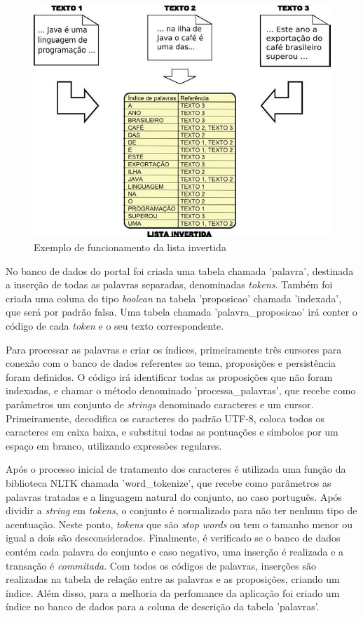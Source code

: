 \documentclass[
	12pt,				%
	openright,			%
	twoside,			%
	a4paper,			%
	english,			%
	french,				%
	spanish,			%
	brazil				%
	]{abntex2}
\begin{document}
{\begin{figure}[htb]
	\caption{\label{listainvertida}Exemplo de funcionamento da lista invertida}
	\begin{center}
	    \includegraphics[scale=0.65]{listainv.jpg}
	\end{center}
\end{figure}

No banco de dados do portal foi criada uma tabela chamada 'palavra', destinada a inserção de todas as palavras separadas, 
denominadas \emph{tokens}. Também foi criada uma coluna do tipo \emph{boolean} na tabela 'proposicao' chamada 'indexada', 
que será por padrão falsa. Uma tabela chamada 'palavra\_proposicao' irá conter o código de cada \emph{token} e o seu texto 
correspondente.

Para processar as palavras e criar os índices, primeiramente três cursores para conexão com o banco de dados referentes ao
tema, proposições e persistência foram definidos. O código irá identificar todas as proposições que não foram indexadas, e 
chamar o método denominado 'processa\_palavras', que recebe como parâmetros um conjunto de \emph{strings} denominado caracteres 
e um cursor. Primeiramente, decodifica os caracteres do padrão UTF-8, coloca todos os caracteres em caixa baixa, e substitui todas
as pontuações e símbolos por um espaço em branco, utilizando expressões regulares.

Após o processo inicial de tratamento dos caracteres é utilizada uma função da biblioteca NLTK chamada 'word\_tokenize', que 
recebe como parâmetros as palavras tratadas e a linguagem natural do conjunto, no caso português. Após dividir a \emph{string} 
em \emph{tokens}, o conjunto é normalizado para não ter nenhum tipo de acentuação. Neste ponto, \emph{tokens} que são \emph{stop words}
ou tem o tamanho menor ou igual a dois são desconsiderados. Finalmente, é verificado se o banco de dados contém cada palavra do conjunto
e caso negativo, uma inserção é realizada e a transação é \emph{commitada}. Com todos os códigos de palavras, inserções são 
realizadas na tabela de relação entre as palavras e as proposições, criando um índice. Além disso, para a melhoria da perfomance
da aplicação foi criado um índice no banco de dados para a coluna de descrição da tabela 'palavras'.

}
\end{document}
